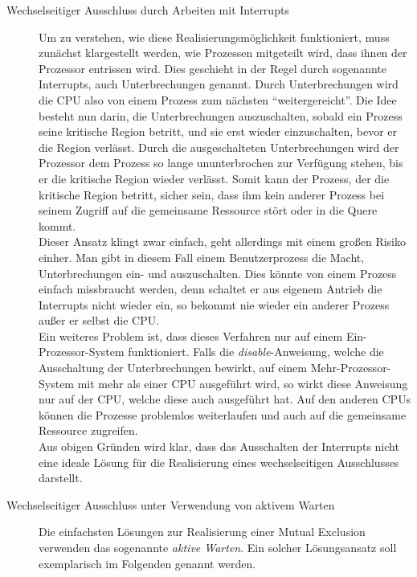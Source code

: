 				\begin{description}
					\item[Wechselseitiger Ausschluss durch Arbeiten mit Interrupts]
					
							Um zu verstehen, wie diese Realisierungsmöglichkeit funktioniert, muss zunächst klargestellt werden, wie Prozessen mitgeteilt wird, dass ihnen der Prozessor entrissen wird. Dies geschieht in der Regel durch sogenannte Interrupts, auch Unterbrechungen genannt. Durch Unterbrechungen wird die CPU also von einem Prozess zum nächsten "`weitergereicht"'. Die Idee besteht nun darin, die Unterbrechungen auszuschalten, sobald ein Prozess seine kritische Region betritt, und sie erst wieder einzuschalten, bevor er die Region verlässt. Durch die ausgeschalteten Unterbrechungen wird der Prozessor dem Prozess so lange ununterbrochen zur Verfügung stehen, bis er die kritische Region wieder verlässt. Somit kann der Prozess, der die kritische Region betritt, sicher sein, dass ihm kein anderer Prozess bei seinem Zugriff auf die gemeinsame Ressource stört oder in die Quere kommt.\\
							Dieser Ansatz klingt zwar einfach, geht allerdings mit einem großen Risiko einher. Man gibt in diesem Fall einem Benutzerprozess die Macht, Unterbrechungen ein- und auszuschalten. Dies könnte von einem Prozess einfach missbraucht werden, denn schaltet er aus eigenem Antrieb die Interrupts nicht wieder ein, so bekommt nie wieder ein anderer Prozess außer er selbst die CPU.\\
							Ein weiteres Problem ist, dass dieses Verfahren nur auf einem Ein-Prozessor-System funktioniert. Falls die \textit{disable}-Anweisung, welche die Ausschaltung der Unterbrechungen bewirkt, auf einem Mehr-Prozessor-System mit mehr als einer CPU ausgeführt wird, so wirkt diese Anweisung nur auf der CPU, welche diese auch ausgeführt hat. Auf den anderen CPUs können die Prozesse problemlos weiterlaufen und auch auf die gemeinsame Ressource zugreifen.\\
							Aus obigen Gründen wird klar, dass das Ausschalten der Interrupts nicht eine ideale Lösung für die Realisierung eines wechselseitigen Ausschlusses darstellt.
							
					\item[Wechselseitiger Ausschluss unter Verwendung von aktivem Warten]
					
						Die einfachsten Lösungen zur Realisierung einer Mutual Exclusion verwenden das sogenannte \textit{aktive Warten}. Ein solcher Lösungsansatz soll exemplarisch im Folgenden genannt werden.
					

\end{description}
